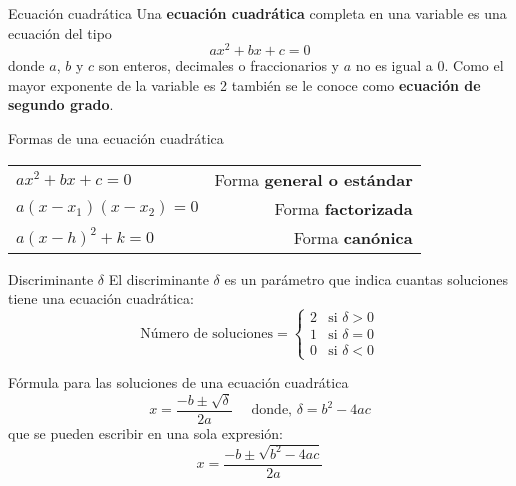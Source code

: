 \begin{infocard}{Ecuación cuadrática}
    Una \textbf{ecuación cuadrática} completa en una variable es una ecuación del tipo
    \begin{equation}
        ax^2 + bx + c = 0
    \end{equation}
    donde $a$, $b$ y $c$ son enteros, decimales o fraccionarios y $a$ no es igual a 0. Como el
    mayor exponente de la variable es 2 también se
    le conoce como \textbf{ecuación de segundo grado}.
\end{infocard}


\begin{infocard}{Formas de una ecuación cuadrática}
    \begin{tabular}{lr}
        $ ax^2+bx+c = 0$    & Forma \textbf{general o estándar} \\
        $a(x-x_1)(x-x_2)=0$ & Forma \textbf{factorizada}        \\
        $a(x-h)^2+k=0$      & Forma \textbf{canónica}
    \end{tabular}
\end{infocard}

\begin{infocard}{Discriminante $\delta$}
    El discriminante $\delta$ es un parámetro que indica cuantas soluciones tiene una ecuación cuadrática:
    \[\text{Número de soluciones}=
        \begin{cases}
            2 & \text{si } \delta > 0 \\
            1 & \text{si } \delta = 0 \\
            0 & \text{si } \delta < 0
        \end{cases}
    \]
\end{infocard}

\begin{infocard}{Fórmula para las soluciones de una ecuación cuadrática}
    \[
        x = \frac{-b\pm \sqrt{\delta}}{2a} \quad \text{ donde, }\delta=b^2-4ac
    \]
    que se pueden escribir en una sola expresión:
    \[x= \dfrac{-b\pm\sqrt{b^2-4ac}}{2a}\]
\end{infocard}